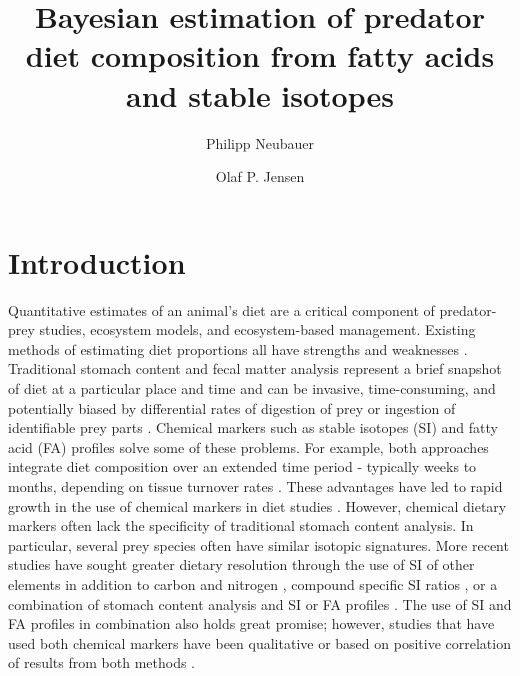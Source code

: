 \documentclass[fleqn,10pt]{wlpeerj}
\title{Bayesian estimation of predator diet composition from fatty
  acids and stable isotopes}
\author[1]{Philipp Neubauer}
\author[2]{Olaf P. Jensen}
\affil[1]{Dragonfly Science, PO Box 27535, Wellington 6141, New Zealand}
\affil[2]{Department of Marine and Coastal Sciences\\Rutgers University, New Brunswick, NJ 08901, USA}
\begin{document}
\flushbottom
\maketitle
\thispagestyle{empty}

\section*{Introduction}

Quantitative estimates of an animal’s diet are a critical component of
predator-prey studies, ecosystem models, and ecosystem-based
management. Existing methods of estimating diet proportions all have
strengths and weaknesses \citep{bowen_methods_2012}. Traditional
stomach content and fecal matter analysis represent a brief snapshot
of diet at a particular place and time and can be invasive,
time-consuming, and potentially biased by differential rates of
digestion of prey or ingestion of identifiable prey parts
\citep{bowen_methods_2012}. Chemical markers such as stable isotopes
(SI) and fatty acid (FA) profiles solve some of these problems.  For
example, both approaches integrate diet composition over an extended
time period -  typically weeks to months, depending on tissue turnover
rates  \citep{tucker_convergence_2008}. These advantages have led to rapid
growth in the use of chemical markers in diet studies
 \citep{elsdon_unraveling_2010,williams_using_2010,kelly_fatty_2011}. However, chemical dietary markers often lack
the specificity of traditional stomach content analysis. In
particular, several prey species often have similar isotopic signatures. More
recent studies have sought greater dietary resolution through the use
of SI of other elements in addition to carbon and
nitrogen \citep[e.g.,][]{belicka_stable_2012}, compound specific SI ratios
\citep[e.g.,][]{budge_tracing_2008,jack_individual_2011}, or a combination of stomach
content analysis and SI or FA profiles \citep[e.g.,][]{pethybridge_seasonal_2012}. The
use of SI and FA profiles in combination also holds great promise; however, studies that have used both chemical markers have been
qualitative \citep[e.g.,][]{guest_trophic_2009} or based on positive correlation
of results from both methods \citep{tucker_convergence_2008}.
\end{document}
